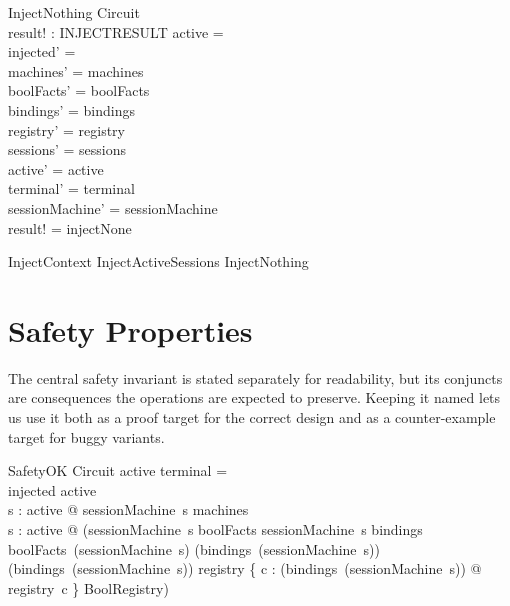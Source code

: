 \documentclass[a4paper,10pt,fleqn]{article}
\begin{document}
\begin{schema}{InjectNothing}
  \Delta Circuit \\
  result! : INJECTRESULT
\where
  active = \emptyset \\
  injected' = \emptyset \\
  machines' = machines \\
  boolFacts' = boolFacts \\
  bindings' = bindings \\
  registry' = registry \\
  sessions' = sessions \\
  active' = active \\
  terminal' = terminal \\
  sessionMachine' = sessionMachine \\
  result! = injectNone
\end{schema}

\begin{zed}
  InjectContext  InjectActiveSessions \lor InjectNothing
\end{zed}

\section{Safety Properties}

The central safety invariant is stated separately for readability, but its
conjuncts are consequences the operations are expected to preserve. Keeping it
named lets us use it both as a proof target for the correct design and as a
counter-example target for buggy variants.

\begin{schema}{SafetyOK}
  Circuit
\where
  active \cap terminal = \emptyset \\
  injected \subseteq active \\
  \forall s : active @ sessionMachine~s \in machines \\
  \forall s : active @
    (sessionMachine~s \in \dom boolFacts \land
     sessionMachine~s \in \dom bindings \land
     boolFacts~(sessionMachine~s) \subseteq \dom (bindings~(sessionMachine~s)) \land
     \ran (bindings~(sessionMachine~s)) \subseteq \dom registry \land
     \{ c : \ran (bindings~(sessionMachine~s)) @ registry~c \} \subseteq BoolRegistry)
\end{schema}
\end{document}
